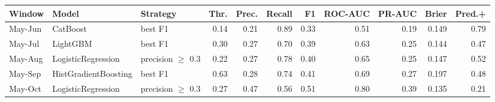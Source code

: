\begin{tabular}{lllrrrrrrrr}
\toprule
Window & Model & Strategy & Thr. & Prec. & Recall & F1 & ROC-AUC & PR-AUC & Brier & Pred.+ \\
\midrule
May-Jun & CatBoost & best F1 & 0.14 & 0.21 & 0.89 & 0.33 & 0.51 & 0.19 & 0.149 & 0.79 \\
May-Jul & LightGBM & best F1 & 0.30 & 0.27 & 0.70 & 0.39 & 0.63 & 0.25 & 0.144 & 0.47 \\
May-Aug & LogisticRegression & precision $\geq$ 0.3 & 0.22 & 0.27 & 0.78 & 0.40 & 0.65 & 0.25 & 0.147 & 0.52 \\
May-Sep & HistGradientBoosting & best F1 & 0.63 & 0.28 & 0.74 & 0.41 & 0.69 & 0.27 & 0.197 & 0.48 \\
May-Oct & LogisticRegression & precision $\geq$ 0.3 & 0.27 & 0.47 & 0.56 & 0.51 & 0.80 & 0.39 & 0.135 & 0.21 \\
\bottomrule
\end{tabular}
